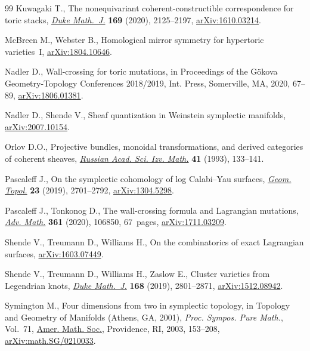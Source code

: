 \begin{thebibliography}{99}
Kuwagaki T., The nonequivariant coherent-constructible correspondence for toric
 stacks, \href{https://doi.org/10.1215/00127094-2020-0011}{\textit{Duke Math.~J.}} \textbf{169} (2020), 2125--2197,
 \href{https://arxiv.org/abs/1610.03214}{arXiv:1610.03214}.

McBreen M., Webster B., Homological mirror symmetry for hypertoric
 varieties~{I}, \href{https://arxiv.org/abs/1804.10646}{arXiv:1804.10646}.

Nadler D., Wall-crossing for toric mutations, in Proceedings of the {G}\"okova
 {G}eometry-{T}opology {C}onferences 2018/2019, Int. Press, Somerville, MA,
 2020, 67--89, \href{https://arxiv.org/abs/1806.01381}{arXiv:1806.01381}.

Nadler D., Shende V., Sheaf quantization in {W}einstein symplectic manifolds,
 \href{https://arxiv.org/abs/2007.10154}{arXiv:2007.10154}.

Orlov D.O., Projective bundles, monoidal transformations, and derived
 categories of coherent sheaves, \href{https://doi.org/10.1070/IM1993v041n01ABEH002182}{\textit{Russian Acad. Sci. Izv. Math.}}
 \textbf{41} (1993), 133--141.

Pascaleff J., On the symplectic cohomology of log {C}alabi--{Y}au surfaces,
 \href{https://doi.org/10.2140/gt.2019.23.2701}{\textit{Geom. Topol.}} \textbf{23} (2019), 2701--2792, \href{https://arxiv.org/abs/1304.5298}{arXiv:1304.5298}.

Pascaleff J., Tonkonog D., The wall-crossing formula and {L}agrangian
 mutations, \href{https://doi.org/10.1016/j.aim.2019.106850}{\textit{Adv. Math.}} \textbf{361} (2020), 106850, 67~pages,
 \href{https://arxiv.org/abs/1711.03209}{arXiv:1711.03209}.

Shende V., Treumann D., Williams H., On the combinatorics of exact {L}agrangian
 surfaces, \href{https://arxiv.org/abs/1603.07449}{arXiv:1603.07449}.

Shende V., Treumann D., Williams H., Zaslow E., Cluster varieties from
 {L}egendrian knots, \href{https://doi.org/10.1215/00127094-2019-0027}{\textit{Duke Math.~J.}} \textbf{168} (2019), 2801--2871,
 \href{https://arxiv.org/abs/1512.08942}{arXiv:1512.08942}.

Symington M., Four dimensions from two in symplectic topology, in Topology and
 Geometry of Manifolds ({A}thens, {GA}, 2001), \textit{Proc. Sympos. Pure
 Math.}, Vol.~71, \href{https://doi.org/10.1090/pspum/071/2024634}{Amer. Math. Soc.}, Providence, RI, 2003, 153--208,
 \href{https://arxiv.org/abs/math.SG/0210033}{arXiv:math.SG/0210033}.


\end{thebibliography}

